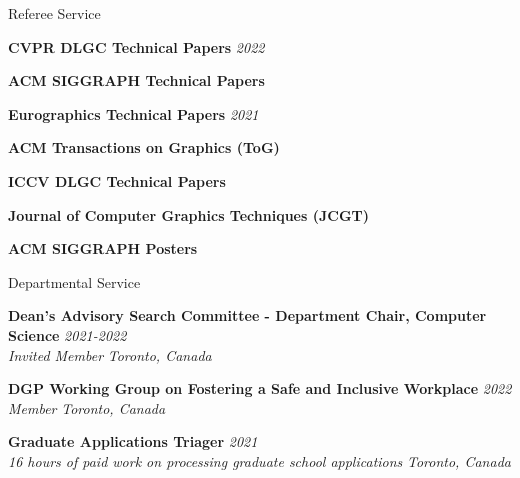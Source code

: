 \documentclass{resume} %
\begin{document}
\begin{rSection}{Referee Service}

{\bf CVPR DLGC Technical Papers} \hfill {\em 2022}

{\bf ACM SIGGRAPH Technical Papers}

{\bf Eurographics Technical Papers} \hfill {\em 2021}

{\bf ACM Transactions on Graphics (ToG)} 

{\bf ICCV DLGC Technical Papers} 

{\bf Journal of Computer Graphics Techniques (JCGT)}

{\bf ACM SIGGRAPH Posters}

\end{rSection}

\begin{rSection}{Departmental Service}

{\bf Dean's Advisory Search Committee -  Department Chair, Computer Science} \hfill {\em 2021-2022}\\ 
{\it Invited Member} \hfill {\em Toronto, Canada}

{\bf DGP Working Group on Fostering a Safe and Inclusive Workplace} \hfill {\em 2022}\\ 
{\it Member} \hfill {\em Toronto, Canada}

{\bf Graduate Applications Triager} \hfill {\em 2021}\\ 
{\it 16 hours of paid work on processing graduate school applications} \hfill {\em Toronto, Canada}

\end{rSection}
\end{document}
